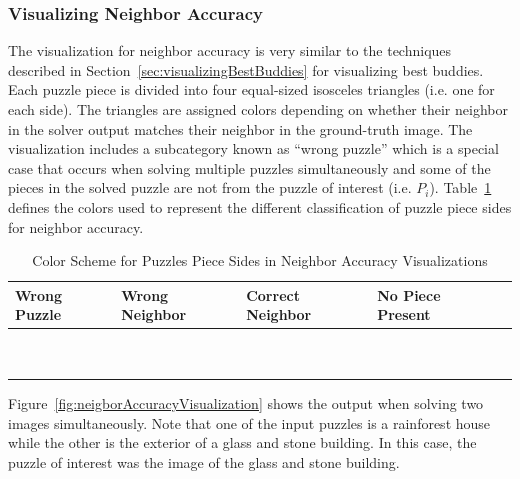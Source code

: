 \documentclass{report}
\begin{document}
\subsubsection{Visualizing Neighbor Accuracy}\label{sec:visualizingNeighborAccuracy}

The visualization for neighbor accuracy is very similar to the techniques described in Section~\ref{sec:visualizingBestBuddies} for visualizing best buddies.  Each puzzle piece is divided into four equal-sized isosceles triangles (i.e. one for each side).  The triangles are assigned colors depending on whether their neighbor in the solver output matches their neighbor in the ground-truth image.  The visualization includes a subcategory known as ``wrong puzzle'' which is a special case that occurs when solving multiple puzzles simultaneously and some of the pieces in the solved puzzle are not from the puzzle of interest (i.e. $P_i$).  Table~\ref{tab:neighborAccuracyColors} defines the colors used to represent the different classification of puzzle piece sides for neighbor accuracy.

\begin{table}[h]
\begin{center}
  \begin{tabular}{ | >{\centering\arraybackslash}m{0.6in} | >{\centering\arraybackslash}m{0.6in} | >{\centering\arraybackslash}m{0.6in} | >{\centering\arraybackslash}m{0.6in} | >{\centering\arraybackslash}m{0.6in} | }
 \hline
    Wrong Puzzle & Wrong Neighbor & Correct Neighbor  & No Piece Present  \\ \hline
	{\cellcolor{blue}~} & {\cellcolor{red}~} & {\cellcolor{green}~} & {\cellcolor{black}~}  \\
	{\cellcolor{blue}~} & {\cellcolor{red}~} & {\cellcolor{green}~} & {\cellcolor{black}~}  \\
 \hline
  \end{tabular}
\end{center}
\caption{Color Scheme for Puzzles Piece Sides in Neighbor Accuracy Visualizations}\label{tab:neighborAccuracyColors}
\end{table}

Figure~\ref{fig:neigborAccuracyVisualization} shows the output when solving two images simultaneously.  Note that one of the input puzzles is a rainforest house while the other is the exterior of a glass and stone building.  In this case, the puzzle of interest was the image of the glass and stone building.
\end{document}
